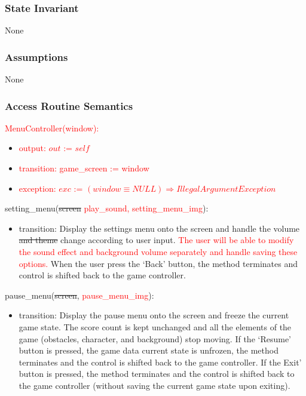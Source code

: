 \documentclass[12pt]{article}
\begin{document}
\subsubsection* {State Invariant}

None

\subsubsection* {Assumptions}

None

\subsubsection* {Access Routine Semantics}
\textcolor{red}{MenuController(window):}
\begin{itemize}
    \item \textcolor{red}{output: $out$ := $self$}
    \item \textcolor{red}{transition: game\_screen := window}
    \item \textcolor{red}{exception: $exc$ := $(window \equiv NULL) \Rightarrow IllegalArgumentException $}
\end{itemize}
\noindent setting\_menu(\sout{screen} \textcolor{red}{play\_sound, setting\_menu\_img}):
\begin{itemize}
    \item transition: Display the settings menu onto the screen and handle the volume \sout{and theme} change according to user input. \textcolor{red}{ The user will be able to modify the sound effect and background volume separately and handle saving these options.} When the user press the `Back' button, the method terminates and control is shifted back to the game controller.
\end{itemize}

\noindent pause\_menu(\sout{screen}, \textcolor{red}{pause\_menu\_img}):
\begin{itemize}
    \item transition: Display the pause menu onto the screen and freeze the current game state. The score count is kept unchanged and all the elements of the game (obstacles, character, and background) stop moving. If the `Resume' button is pressed, the game data current state is unfrozen, the method terminates and the control is shifted back to the game controller. If the Exit' button is pressed, the method terminates and the control is shifted back to the game controller (without saving the current game state upon exiting).
\end{itemize}
\end{document}
